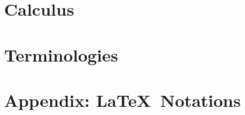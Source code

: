 \documentclass[12pt]{article}
\theoremstyle{definition}
\begin{document}
 	\section{Calculus}
 	\section{Terminologies}
 	\label{sec:terms}
 	\section{Appendix: \LaTeX\ Notations}
	
\end{document}

